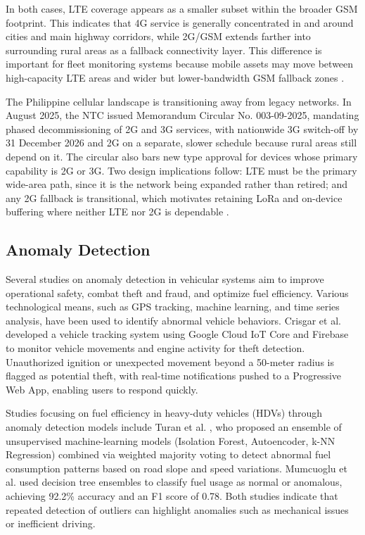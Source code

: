 In both cases, LTE coverage appears as a smaller subset within the broader GSM footprint. This indicates that 4G service is generally concentrated in and around cities and main highway corridors, while 2G/GSM extends farther into surrounding rural areas as a fallback connectivity layer. This difference is important for fleet monitoring systems because mobile assets may move between high-capacity LTE areas and wider but lower-bandwidth GSM fallback zones \cite{opensignal_seasia_coverage,gsma2026coverage}.


The Philippine cellular landscape is transitioning away from legacy networks. In August 2025, the NTC issued Memorandum Circular No. 003-09-2025, mandating phased decommissioning of 2G and 3G services, with nationwide 3G switch-off by 31 December 2026 and 2G on a separate, slower schedule because rural areas still depend on it. The circular also bars new type approval for devices whose primary capability is 2G or 3G. Two design implications follow: LTE must be the primary wide-area path, since it is the network being expanded rather than retired; and any 2G fallback is transitional, which motivates retaining LoRa and on-device buffering where neither LTE nor 2G is dependable \cite{ntc2025legacy_network_phaseout}.

\subsection{Anomaly Detection}

Several studies on anomaly detection in vehicular systems aim to improve operational safety, combat theft and fraud, and optimize fuel efficiency. Various technological means, such as GPS tracking, machine learning, and time series analysis, have been used to identify abnormal vehicle behaviors. Crisgar et al. \cite{crisgar2021gps} developed a vehicle tracking system using Google Cloud IoT Core and Firebase to monitor vehicle movements and engine activity for theft detection. Unauthorized ignition or unexpected movement beyond a 50-meter radius is flagged as potential theft, with real-time notifications pushed to a Progressive Web App, enabling users to respond quickly.

Studies focusing on fuel efficiency in heavy-duty vehicles (HDVs) through anomaly detection models include Turan et al. \cite{turan2024detecting}, who proposed an ensemble of unsupervised machine-learning models (Isolation Forest, Autoencoder, k-NN Regression) combined via weighted majority voting to detect abnormal fuel consumption patterns based on road slope and speed variations. Mumcuoglu et al. \cite{mumcuoglu2023fuel} used decision tree ensembles to classify fuel usage as normal or anomalous, achieving 92.2\% accuracy and an F1 score of 0.78. Both studies indicate that repeated detection of outliers can highlight anomalies such as mechanical issues or inefficient driving.

